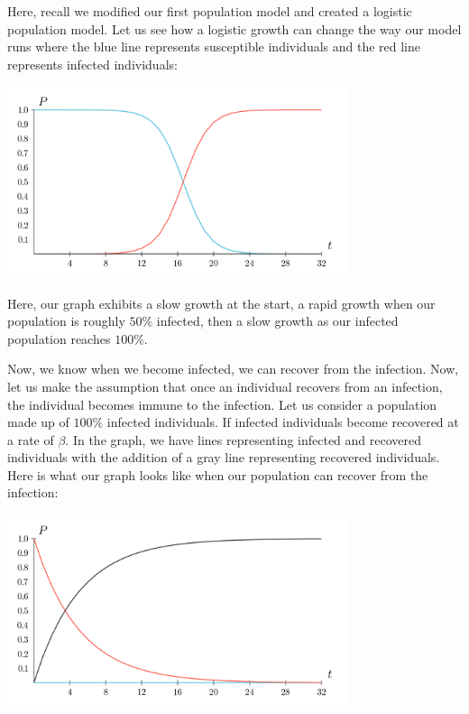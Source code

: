 \documentclass{amsart}
\theoremstyle{definition}
\numberwithin{equation}{section}
\begin{document}
\begin{sansmath}
Here, recall we modified our first population model and created a logistic population model. Let us see how a logistic growth can change the way our model runs where the blue line represents susceptible individuals and the red line represents infected individuals:

\begin{center}
  \includegraphics[width=10cm]{SIRLogistic}
\end{center}

Here, our graph exhibits a slow growth at the start, a rapid growth when our population is roughly $50\%$ infected, then a slow growth as our infected population reaches $100\%$.

Now, we know when we become infected, we can recover from the infection. Now, let us make the assumption that once an individual recovers from an infection, the individual becomes immune to the infection. Let us consider a population made up of $100\%$ infected individuals. If infected individuals become recovered at a rate of $\beta$. In the graph, we have lines representing infected and recovered individuals with the addition of a gray line representing recovered individuals. Here is what our graph looks like when our population can recover from the infection:

\begin{center}
  \includegraphics[width=10cm]{SIRDecay}
\end{center}


\end{sansmath}
\end{document}
